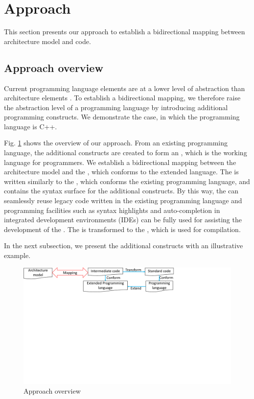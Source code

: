 \section{Approach}
\label{sec:approach}
This section presents our approach to establish a bidirectional mapping between architecture model and code.


\subsection{Approach overview}
Current programming language elements are at a lower level of abstraction than architecture elements \cite{DeSilva2012}.
To establish a bidirectional mapping, we therefore raise the abstraction level of a programming language by introducing additional programming constructs.
We demonstrate the case, in which the programming language is C++.

Fig. \ref{fig:mappingoverview} shows the overview of our approach.
From an existing programming language, the additional constructs are created to form an , which is the working language for programmers.
We establish a bidirectional mapping between the architecture model and the , which conforms to the extended language.
The  is written similarly to the , which conforms the existing programming language, and contains the syntax surface for the additional constructs. 
By this way, the  can seamlessly reuse legacy code written in the existing programming language and programming facilities such as syntax highlights and auto-completion in integrated development environments (IDEs) can be fully used for assisting the development of the . 
The  is transformed to the , which is used for compilation.

In the next subsection, we present the additional constructs with an illustrative example.


\begin{figure}
	\centering
	\includegraphics[clip, trim=0cm 15cm 9.1cm 0cm, width=\columnwidth]{figures/mappingoverview.pdf}
	\caption{Approach overview} 
	\label{fig:mappingoverview}
\end{figure}



